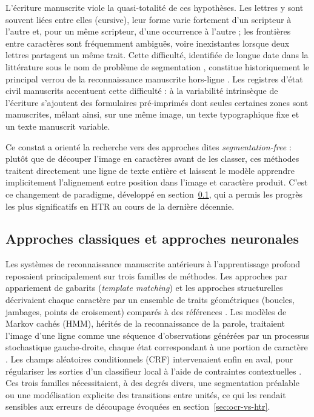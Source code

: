 L'écriture manuscrite viole la quasi-totalité de ces hypothèses. Les lettres y sont souvent liées entre elles (cursive), leur forme varie fortement d'un scripteur à l'autre et, pour un même scripteur, d'une occurrence à l'autre ; les frontières entre caractères sont fréquemment ambiguës, voire inexistantes lorsque deux lettres partagent un même trait.
Cette difficulté, identifiée de longue date dans la littérature sous le nom de \og problème de segmentation \fg{}, constitue historiquement le principal verrou de la reconnaissance manuscrite hors-ligne \cite{Plamondon2000OnLineAO}.
Les registres d'état civil manuscrits accentuent cette difficulté : à la variabilité intrinsèque de l'écriture s'ajoutent des formulaires pré-imprimés dont seules certaines zones sont manuscrites, mêlant ainsi, sur une même image, un texte typographique fixe et un texte manuscrit variable.

Ce constat a orienté la recherche vers des approches dites \textit{segmentation-free} : plutôt que de découper l'image en caractères avant de les classer, ces méthodes traitent directement une ligne de texte entière et laissent le modèle apprendre implicitement l'alignement entre position dans l'image et caractère produit.
C'est ce changement de paradigme, développé en section~\ref{sec:approches-classiques-neuronales}, qui a permis les progrès les plus significatifs en HTR au cours de la dernière décennie.

\subsection{Approches classiques et approches neuronales}
\label{sec:approches-classiques-neuronales}

Les systèmes de reconnaissance manuscrite antérieurs à l'apprentissage profond reposaient principalement sur trois familles de méthodes.
Les approches par appariement de gabarits (\textit{template matching}) et les approches structurelles décrivaient chaque caractère par un ensemble de traits géométriques (boucles, jambages, points de croisement) comparés à des références \cite{Plamondon2000OnLineAO,mantel2005structural}.
Les modèles de Markov cachés (HMM), hérités de la reconnaissance de la parole, traitaient l'image d'une ligne comme une séquence d'observations générées par un processus stochastique gauche-droite, chaque état correspondant à une portion de caractère \cite{291449}.
Les champs aléatoires conditionnels (CRF) intervenaient enfin en aval, pour régulariser les sorties d'un classifieur local à l'aide de contraintes contextuelles \cite{4377085}.
Ces trois familles nécessitaient, à des degrés divers, une segmentation préalable ou une modélisation explicite des transitions entre unités, ce qui les rendait sensibles aux erreurs de découpage évoquées en section~\ref{sec:ocr-vs-htr}.

